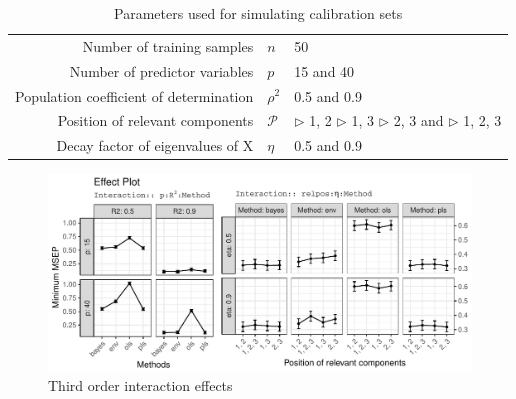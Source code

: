 \documentclass[12pt, a4paper]{article}
\begin{document}
\doublespacing

\begin{table}[ht]
  \centering
  \begin{tabular}{rll}
    Number of training samples              & $n$      & 50                \\
    Number of predictor variables           & $p$      & 15 and 40         \\
    Population coefficient of determination & $\rho^2$ & 0.5 and 0.9       \\
    Position of relevant components         & $\mathcal{P}$
                                            & $\triangleright$ 1, 2 \;
                                                         $\triangleright$ 1,  3 \; \newline
                                                         $\triangleright$ 2,  3 and \;
                                                         $\triangleright$ 1,  2, 3 \\
    Decay factor of eigenvalues of X        & $\eta$   & 0.5 and 0.9
  \end{tabular}
  \caption{Parameters used for simulating calibration sets}
  \label{tab:parameters}
\end{table}

\pagebreak

\begin{figure}[!ht]
  \centering
  \includegraphics[width=\textwidth]{pdf/effect-plot.pdf}
  \caption{Third order interaction effects}
  \label{fig:effect-plot}
\end{figure}

\pagebreak
\end{document}
